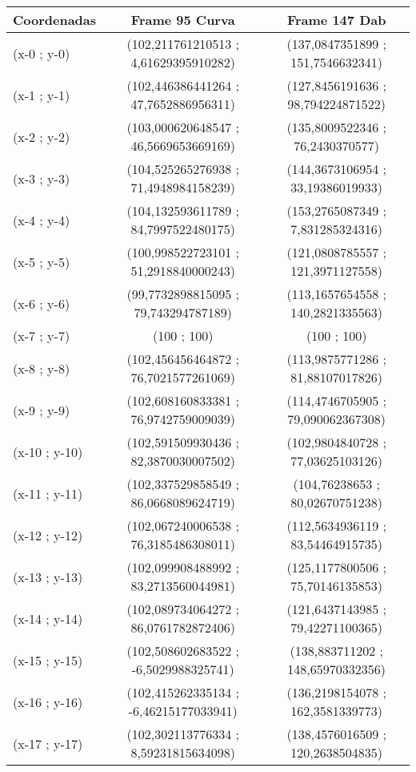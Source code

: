 \begin{table}[htbp]
	\centering
	\begin{tabular}{|l|c|c|}
		\hline
		Coordenadas & Frame 95 Curva & Frame 147 Dab \\ \hline
		(x-0 ; y-0) & (102,211761210513 ; 4,61629395910282) & (137,0847351899 ; 151,7546632341) \\
		(x-1 ; y-1) & (102,446386441264 ; 47,7652886956311) & (127,8456191636 ; 98,794224871522) \\
		(x-2 ; y-2) & (103,000620648547 ; 46,5669653669169) & (135,8009522346 ; 76,2430370577) \\
		(x-3 ; y-3) & (104,525265276938 ; 71,4948984158239) & (144,3673106954 ; 33,19386019933) \\
		(x-4 ; y-4) & (104,132593611789 ; 84,7997522480175) & (153,2765087349 ; 7,831285324316) \\
		(x-5 ; y-5) & (100,998522723101 ; 51,2918840000243) & (121,0808785557 ; 121,3971127558) \\
		(x-6 ; y-6) & (99,7732898815095 ; 79,743294787189) & (113,1657654558 ; 140,2821335563) \\
		(x-7 ; y-7) & (100 ; 100) & (100 ; 100) \\
		(x-8 ; y-8) & (102,456456464872 ; 76,7021577261069) & (113,9875771286 ; 81,88107017826) \\
		(x-9 ; y-9) & (102,608160833381 ; 76,9742759009039) & (114,4746705905 ; 79,090062367308) \\
		(x-10 ; y-10) & (102,591509930436 ; 82,3870030007502) & (102,9804840728 ; 77,03625103126) \\
		(x-11 ; y-11) & (102,337529858549 ; 86,0668089624719) & (104,76238653 ; 80,02670751238) \\
		(x-12 ; y-12) & (102,067240006538 ; 76,3185486308011) & (112,5634936119 ; 83,54464915735) \\
		(x-13 ; y-13) & (102,099908488992 ; 83,2713560044981) & (125,1177800506 ; 75,70146135853) \\
		(x-14 ; y-14) & (102,089734064272 ; 86,0761782872406) & (121,6437143985 ; 79,42271100365) \\
		(x-15 ; y-15) & (102,508602683522 ; -6,5029988325741) & (138,883711202 ; 148,65970332356) \\
		(x-16 ; y-16) & (102,415262335134 ; -6,46215177033941) & (136,2198154078 ; 162,3581339773) \\
		(x-17 ; y-17) & (102,302113776334 ; 8,59231815634098) & (138,4576016509 ; 120,2638504835) \\

\end{tabular}
\end{table}
